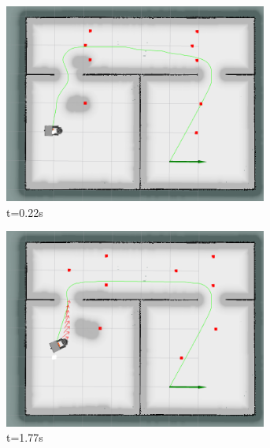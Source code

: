 \begin{figure}[!ht]
    \centering
    \begin{subfigure}[b]{0.35\linewidth}
        \centering
        \includegraphics[width=0.95\textwidth]{images/teb_double/2/772.png} \caption{t=0.22s}
    \end{subfigure}%
    \begin{subfigure}[b]{0.35\linewidth}
        \centering
        \includegraphics[width=0.95\textwidth]{images/teb_double/2/927.png} \caption{t=1.77s}
    \end{subfigure}%
    \begin{subfigure}[b]{0.35\linewidth}
        \centering

\end{subfigure}
\end{figure}
